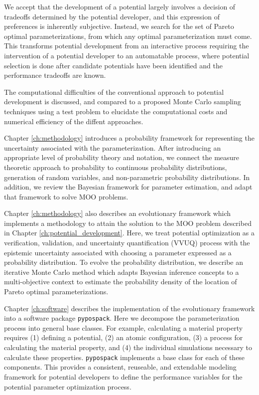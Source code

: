 We accept that the development of a potential largely involves a decision of tradeoffs determined by the potential developer, and this expression of preferences is inherently subjective.  Instead, we search for the set of Pareto optimal parameterizations, from which any optimal parameterization must come.  This transforms potential development from an interactive process requiring the intervention of a potential developer to an automatable process, where potential selection is done after candidate potentials have been identified and the performance tradeoffs are known.

The computational difficulties of the conventional approach to potential development is discussed, and compared to a proposed Monte Carlo sampling techniques using a test problem to elucidate the computational costs and numerical efficiency of the diffent approaches.

Chapter \ref{ch:methodology} introduces a probability framework for representing the uncertainty associated with the parameterization.   After introducing an appropriate level of probability theory and notation, we connect the measure theoretic approach to probability to continuous probability distributions, generation of random variables, and non-parametric probability distributions.  In addition, we review the Bayesian framework for parameter estimation, and adapt that framework to solve MOO problems.

Chapter \ref{ch:methodology} also describes an evolutionary framework which implements a methodology to attain the solution to the MOO problem described in Chapter \ref{ch:potential_development}.  Here, we treat potential optimization as a verification, validation, and uncertainty quantification (VVUQ) process with the epistemic uncertainty associated with choosing a parameter expressed as a probability distribution.  To evolve the probability distribution, we describe an iterative Monte Carlo method which adapts Bayesian inference concepts to a multi-objective context to estimate the probability density of the location of Pareto optimal parameterizations.

Chapter \ref{ch:software} describes the implementation of the evolutionary framework into a software package \verb|pypospack|.  Here we decompose the parameterization process into general base classes.  For example, calculating a material property requires (1) defining a potential, (2) an atomic configuration, (3) a process for calculating the material property, and (4) the individual simulations necessary to calculate these properties.  \verb|pypospack| implements a base class for each of these components.  This provides a consistent, reuseable, and extendable modeling framework for potential developers to define the performance variables for the potential parameter optimization process.

